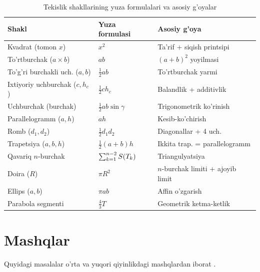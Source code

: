 \begin{table}[h]
\centering
\renewcommand{\arraystretch}{1.5}
\begin{tabular}{@{} l l l @{}}
\toprule
\textbf{Shakl} & \textbf{Yuza formulasi} & \textbf{Asosiy g'oya} \\
\midrule
Kvadrat (tomon $x$)       & $x^2$               & Ta'rif + siqish printsipi \\
To'rtburchak ($a\times b$) & $ab$               & $(a+b)^2$ yoyilmasi \\
To'g'ri burchakli uch. ($a,b$) & $\tfrac{1}{2}ab$ & To'rtburchak yarmi \\
Ixtiyoriy uchburchak ($c, h_c$) & $\tfrac{1}{2}ch_c$ & Balandlik + additivlik \\
Uchburchak (burchak) & $\tfrac{1}{2}ab\sin\gamma$ & Trigonometrik ko'rinish \\
Parallelogramm ($a, h$) & $ah$                & Kesib-ko'chirish \\
Romb ($d_1, d_2$)       & $\tfrac{1}{2}d_1 d_2$ & Diagonallar + 4 uch. \\
Trapetsiya ($a,b,h$)    & $\tfrac{1}{2}(a+b)h$ & Ikkita trap. = parallelogramm \\
Qavariq $n$-burchak    & $\sum_{k=1}^{n-2}S\!\left(T_k\right)$ & Triangulyatsiya \\
Doira ($R$)             & $\pi R^2$           & $n$-burchak limiti + ajoyib limit \\
Ellips ($a,b$)          & $\pi ab$            & Affin o'zgarish \\
Parabola segmenti & $\tfrac{4}{3}T$      & Geometrik ketma-ketlik \\
\bottomrule
\end{tabular}
\caption{Tekislik shakllarining yuza formulalari va asosiy g'oyalar}
\label{tab:summary}
\end{table}

\section{Mashqlar}
\label{sec:exercises}

Quyidagi masalalar o'rta va yuqori qiyinlikdagi mashqlardan iborat
\cite{Prasolov2006, Apostol1967}.

